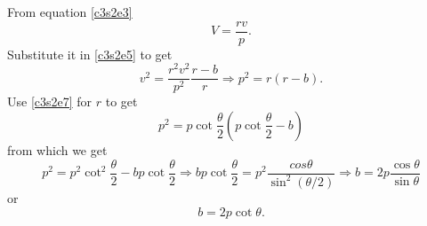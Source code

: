 From equation \eqref{c3s2e3}
\[
V = \frac{rv}{p}.
\]
Substitute it in \eqref{c3s2e5} to get
\begin{equation}\label{c3s2e8}
v^2 = \frac{r^2v^2}{p^2}\frac{r - b}{r} \Rightarrow p^2 = r(r - b).
\end{equation}
Use \eqref{c3s2e7} for $r$ to get
\begin{equation}\label{c3s2e9}
p^2 = p\cot\frac{\theta}{2}\left(p\cot\frac{\theta}{2} - b\right)
\end{equation}
from which we get
\[
p^2 = p^2\cot^2\frac{\theta}{2} - bp\cot\frac{\theta}{2} \Rightarrow
bp\cot\frac{\theta}{2} = p^2\frac{cos\theta}{\sin^2(\theta/2)} \Rightarrow
b = 2p\frac{\cos\theta}{\sin\theta}
\]
or
\begin{equation}\label{c2s2e10}
b = 2p\cot\theta.
\end{equation}

